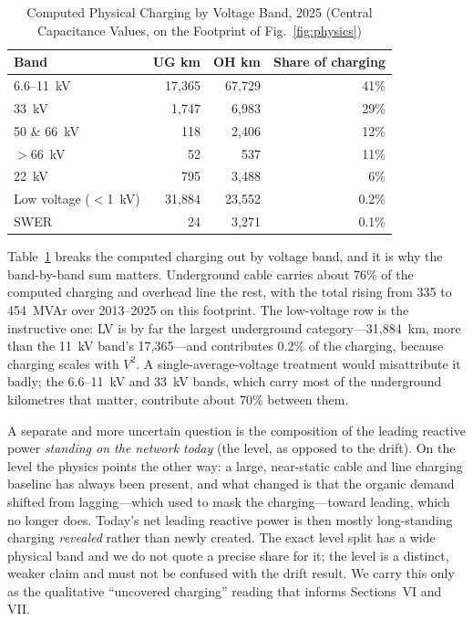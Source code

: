 \documentclass[journal]{IEEEtran}
\begin{document}
\begin{table}[!t]
\caption{Computed Physical Charging by Voltage Band, 2025 (Central
Capacitance Values, on the Footprint of Fig.~\ref{fig:physics})}
\label{tab:bands}
\centering
\renewcommand{\arraystretch}{1.18}
\begin{tabular}{@{}lrrr@{}}
\toprule
\textbf{Band} & \textbf{UG km} & \textbf{OH km} & \textbf{Share of charging} \\
\midrule
6.6--11~kV            & 17,365 & 67,729 & 41\%  \\
33~kV                 &  1,747 &  6,983 & 29\%  \\
50 \& 66~kV           &    118 &  2,406 & 12\%  \\
$>$66~kV              &     52 &    537 & 11\%  \\
22~kV                 &    795 &  3,488 & 6\%   \\
Low voltage ($<$1~kV) & 31,884 & 23,552 & 0.2\% \\
SWER                  &     24 &  3,271 & 0.1\% \\
\bottomrule
\end{tabular}
\end{table}

Table~\ref{tab:bands} breaks the computed charging out by voltage band, and
it is why the band-by-band sum matters. Underground cable carries about 76\%
of the computed charging and overhead line the rest, with the total rising
from 335 to 454~MVAr over 2013--2025 on this footprint. The low-voltage row
is the instructive one: LV is by far the largest underground
category---31,884~km, more than the 11~kV band's 17,365---and contributes
0.2\% of the charging, because charging scales with $V^2$. A
single-average-voltage treatment would misattribute it badly; the 6.6--11~kV
and 33~kV bands, which carry most of the underground kilometres that matter,
contribute about 70\% between them.

A separate and more uncertain question is the composition of the leading reactive
power \emph{standing on the network today} (the level, as opposed to the drift). On
the level the physics points the other way: a large, near-static cable and line
charging baseline has always been present, and what changed is that the organic
demand shifted from lagging---which used to mask the charging---toward leading,
which no longer does. Today's net leading reactive power is then mostly
long-standing charging \emph{revealed} rather than newly created. The exact level
split has a wide physical band and we do not quote a precise share for it; the level
is a distinct, weaker claim and must not be confused with the drift result. We carry
this only as the qualitative ``uncovered charging'' reading that informs
Sections~VI and VII.
\end{document}
